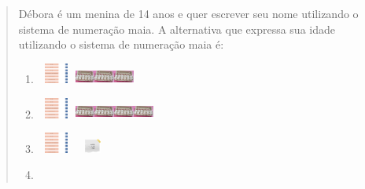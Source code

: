 \begin{enumerate}
\begin{escolha}
\begin{enumerate}
\begin{itemize}
\begin{itemize}
\begin{escolha}
\begin{quote}
\begin{escolha}
{Débora é um menina de 14 anos e quer escrever seu nome utilizando o
sistema de numeração maia. A alternativa que expressa sua idade
utilizando o sistema de numeração maia é:

\begin{enumerate}
\def\labelenumi{\alph{enumi})}
\item
  \includegraphics[width=0.50004in,height=0.26669in]{media/image14.png}\includegraphics[width=0.25836in,height=0.18335in]{media/image15.png}\includegraphics[width=0.25836in,height=0.18335in]{media/image15.png}\includegraphics[width=0.25836in,height=0.18335in]{media/image15.png}
\item
  \includegraphics[width=0.50004in,height=0.26669in]{media/image14.png}\includegraphics[width=0.25836in,height=0.18335in]{media/image15.png}\includegraphics[width=0.25836in,height=0.18335in]{media/image15.png}\includegraphics[width=0.25836in,height=0.18335in]{media/image15.png}\includegraphics[width=0.25836in,height=0.18335in]{media/image15.png}
\item
  \includegraphics[width=0.50004in,height=0.26669in]{media/image14.png}\includegraphics[width=0.47504in,height=0.18335in]{media/image16.png}
\item

\end{enumerate}}
\end{escolha}
\end{quote}
\end{escolha}
\end{itemize}
\end{itemize}
\end{enumerate}
\end{escolha}
\end{enumerate}
